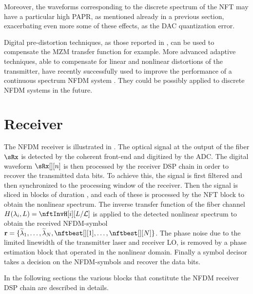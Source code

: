 
Moreover, the waveforms corresponding to the discrete spectrum of the \ac{NFT} may
have a particular high \ac{PAPR}, as mentioned already in
a previous section, exacerbating even more some of these effects, as the \ac{DAC}
quantization error.

Digital pre-distortion techniques, as those reported in \cite{napoli2017digital}, can be used to
compensate the \ac{MZM} transfer function for example. More advanced adaptive
techniques, able to compensate for linear and nonlinear distortions of the
transmitter, have recently successfully used to improve the performance of a
continuous spectrum \ac{NFDM} system \cite{Le2017}. They could be possibly applied to  discrete \ac{NFDM} systems in the future.



\section{Receiver}\label{sec:nfdm_receiver}
The \ac{NFDM} receiver is illustrated in . The optical
signal  at the output of the fiber $\sRx$ is detected by the coherent front-end
and digitized by the \ac{ADC}. The digital waveform $\sdRx$ is then processed by
the receiver \ac{DSP} chain in order to recover the transmitted data bits. To
achieve this, the signal is first filtered and then synchronized to the processing
window of the receiver. Then the signal is sliced in blocks of duration \Ts{},
and each of these is processed by the \ac{NFT} block to obtain the nonlinear
spectrum. The inverse transfer function of the fiber channel
$H(\eig[i], \fiberl) = \nftInvH[i][\fiberl / \nftcvL]$ is applied to
the detected nonlinear spectrum to obtain the received \ac{NFDM}-symbol {$\matr{r} =
\nfdmsymrx{}$}. The phase noise due to the limited linewidth of the transmitter laser and receiver \ac{LO}, is removed by a  phase estimation block that operated in the nonlinear domain. Finally a symbol decisor takes a decision on the
\ac{NFDM}-symbols and recover the data bits.

In the following sections the various blocks that constitute the \ac{NFDM} receiver \ac{DSP} chain are described in details.

